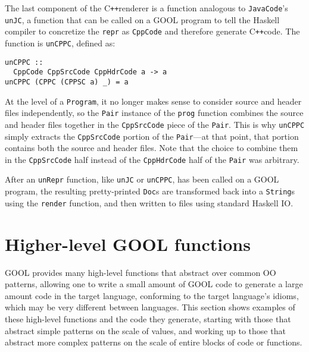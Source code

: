 \documentclass[sigplan,review,anonymous,prologue,dvipsnames]{acmart}
\newcommand{\Cplusplus}{C\texttt{++}}
\begin{document}
The last component of the \Cplusplus renderer is a function analogous to
\verb|JavaCode|'s \verb|unJC|, a function that can be called on a GOOL program
to tell the Haskell compiler to concretize the \verb|repr| as \verb|CppCode|
and therefore generate \Cplusplus code. The function is \verb|unCPPC|, defined as:
\begin{lstlisting}
unCPPC ::
  CppCode CppSrcCode CppHdrCode a -> a
unCPPC (CPPC (CPPSC a) _) = a
\end{lstlisting}
At the level of a \verb|Program|, it no longer makes sense to consider source
and header files independently, so the \verb|Pair| instance of the \verb|prog|
function combines the source and header files together in the \verb|CppSrcCode|
piece of the \verb|Pair|. This is why \verb|unCPPC| simply extracts the
\verb|CppSrcCode| portion of the \verb|Pair|---at that point, that portion
contains both the source and header files. Note that the choice to combine them
in the \verb|CppSrcCode| half instead of the \verb|CppHdrCode| half of the
\verb|Pair| was arbitrary.

After an \verb|unRepr| function, like \verb|unJC| or \verb|unCPPC|, has been
called on a GOOL program, the resulting pretty-printed \verb|Doc|s are
transformed back into a \verb|String|s using the \verb|render| function, and
then written to files using standard Haskell IO.

\section{Higher-level GOOL functions} \label{sec:patterns}

GOOL provides many high-level functions that abstract over common OO patterns,
allowing one to write a small amount of GOOL code to generate a large amount
code in the target language, conforming to the target language's idioms, which
may be very different between languages. This section shows examples of these
high-level functions and the code they generate, starting with those that
abstract simple patterns on the scale of values, and working up to those that
abstract more complex patterns on the scale of entire blocks of code or
functions.
\end{document}
